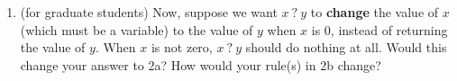 \documentclass[11pt]{article}
\begin{document}
\begin{enumerate}
\begin{enumerate}
\vspace{1.8in}


\item (for graduate students) Now, suppose we want $x\ \texttt{?}\ y$ to \textbf{change} the value of $x$ (which must be a variable) to the value of $y$ when $x$ is 0, instead of returning the value of $y$. When $x$ is not zero, $x\ \texttt{?}\ y$ should do nothing at all. Would this change your answer to 2a? How would your rule(s) in 2b change?


\end{enumerate}

\end{enumerate}
\end{document}
